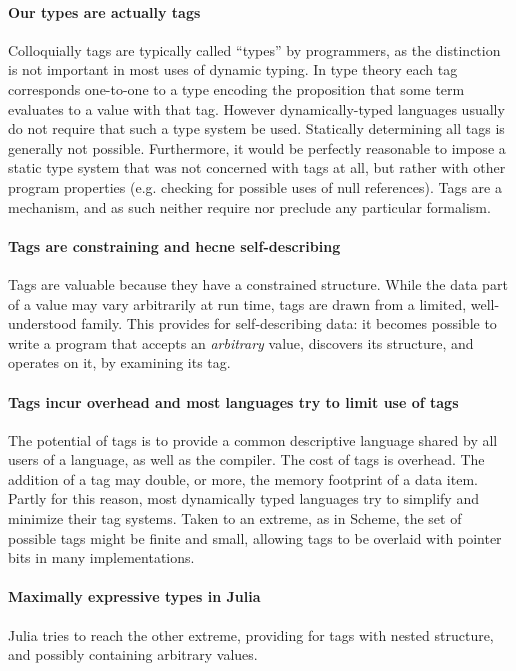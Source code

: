 \documentclass[pldi]{sigplanconf-pldi15}
\begin{document}
\paragraph{Our types are actually tags}
Colloquially tags are typically called ``types'' by programmers, as the distinction
is not important in most uses of dynamic typing. In type theory each tag corresponds
one-to-one to a type encoding the proposition that some term evaluates to a value
with that tag. However dynamically-typed languages usually do not require that such
a type system be used. Statically determining all tags is generally not possible.
Furthermore, it would be perfectly reasonable to impose a static type system that
was not concerned with tags at all, but rather with other program properties
(e.g. checking for possible uses of null references). Tags are a mechanism, and as
such neither require nor preclude any particular formalism.

\paragraph{Tags are constraining and hecne self-describing}
Tags are valuable because they have a constrained structure. While the data
part of a value may vary arbitrarily at run time, tags are drawn from a limited,
well-understood family. This provides for self-describing data: it becomes possible
to write a program that accepts an \emph{arbitrary} value, discovers its structure,
and operates on it, by examining its tag.

\paragraph{Tags incur overhead and most languages try to limit use of tags}
The potential of tags is to provide a common descriptive language shared by all users
of a language, as well as the compiler. The cost of tags is overhead. The addition of
a tag may double, or more, the memory footprint of a data item. Partly for this reason,
most dynamically typed languages try to simplify and minimize their tag systems.
 Taken to an extreme,
as in Scheme, the set of possible tags might be finite and small, allowing tags to be
overlaid with pointer bits in many implementations.

\paragraph{Maximally expressive types in Julia}
Julia tries to reach the other extreme, providing for tags with nested structure, and
possibly containing arbitrary values.
\end{document}
